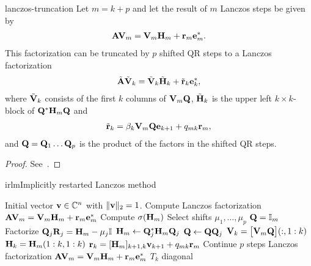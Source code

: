 \begin{Lemma}{lanczos-truncation}
  Let $m=k+p$ and let the result of $m$ Lanczos steps be given by
  \begin{gather}
    \mathbf A\mathbf V_m = \mathbf V_m\mathbf H_m + \mathbf r_m\mathbf e_m^*.
  \end{gather}
  This factorization can be truncated by $p$ shifted QR steps to a
  Lanczos factorization
    \begin{gather}
    \tilde{\mathbf A}\tilde{\mathbf V}_k = \tilde{\mathbf V}_k\tilde{\mathbf H}_k + \tilde{\mathbf r}_k\mathbf e_k^*,
  \end{gather}
  where $\tilde{\mathbf V}_k$ consists of the first $k$ columns of $\mathbf V_m\mathbf Q$, $\tilde{\mathbf H}_k$ is the upper left $k\times k$-block of $\mathbf Q^*\mathbf H_m\mathbf Q$ and
  \begin{gather}
    \tilde{\mathbf r}_k = \beta_k\mathbf V_m\mathbf Q \mathbf e_{k+1} + q_{mk} \mathbf r_m ,
  \end{gather}
  and $\mathbf Q=\mathbf Q_1\dots\mathbf Q_p$ is the product of the factors in the
  shifted QR steps.
\end{Lemma}

\begin{proof}
  See~\cite[Section 4.5.1]{BaiDemmelDongarraRuhevanderVorst00}.
\end{proof}

\begin{Algorithm*}{irlm}{Implicitly restarted Lanczos method}
  \begin{algorithmic}[1]
    \Require Initial vector $\mathbf v\in\mathbb C^n$ with $\lVert\mathbf v\rVert_2=1$.
    \State Compute Lanczos factorization
    $\mathbf A\mathbf V_m = \mathbf V_m\mathbf H_m + \mathbf r_m\mathbf e_m^*$
    \Repeat
    \State Compute $\sigma(\mathbf H_m)$
    \State Select shifts $\mu_1,\dots,\mu_p$
    \State $\mathbf Q = \mathbb I_m$
    \State Factorize $\mathbf Q_j\mathbf R_j = \mathbf H_m - \mu_j\mathbb I$
    \State $\mathbf H_m \gets \mathbf Q_j^*\mathbf H_m\mathbf Q_j$
    \State $\mathbf Q \gets \mathbf Q\mathbf Q_j$
    \EndFor
    \State $\mathbf V_k = \bigl[\mathbf V_m\mathbf Q\bigr](:,1:k)$
    \State $\mathbf H_k = \mathbf H_m(1:k,1:k)$
    \State $\mathbf r_k= [\mathbf H_m]_{k+1,k}\mathbf v_{k+1} + q_{mk}\mathbf r_m$
    \State Continue $p$ steps Lanczos factorization
    $\mathbf A\mathbf V_m = \mathbf V_m\mathbf H_m + \mathbf r_m\mathbf e_m^*$
    \Until $T_k$ diagonal
  \end{algorithmic}
\end{Algorithm*}

